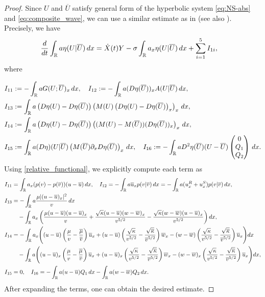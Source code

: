 \documentclass[11pt,reqno]{amsart}
\begin{document}
\begin{proof}
Since $U$ and $\overline{U}$ satisfy general form of the hyperbolic system \eqref{eq:NS-abs} and \eqref{eq:composite_wave}, we can use a similar estimate as in \cite[Lemma 2.3]{KV21} (see also \cite[Lemma 4.2]{HKKL_pre}). Precisely, we have 
\begin{align*}
\frac{d}{dt} \int_\mathbb{R} a \eta (U|\overline{U}) \, dx &=\dot{X}(t)Y-\sigma\int_\mathbb{R} a_x\eta(U|\overline{U}) \, dx+ \sum_{i=1}^5 I_{1i},
\end{align*}
where

\begin{align*}
I_{11}&:=-\int_\mathbb{R} a G(U;\overline{U})_x \, dx,\quad I_{12}:=-\int_\mathbb{R} a (D \eta (\overline{U}))_x A(U| \overline{U}) \, dx,\\
I_{13}&:=\int_\mathbb{R} a \left(D\eta(U)-D\eta(\overline{U}) \right) \left(M(U)\left(D\eta (U)-D\eta(\overline{U}) \right)_x\right)_x\, dx,\\
I_{14}&:=\int_\mathbb{R} a \left( D \eta(U)-D\eta(\overline{U})\right)\left( (M(U) -M(\overline{U}))(D \eta(\overline{U}))_x\right)_x\,dx,\\
I_{15}&:=\int_\mathbb{R}a (D\eta)(U|\overline{U}) \left( M(\overline{U}) \partial_x D \eta(\overline{U}) \right)_x\, dx,\quad I_{16}:=-\int_\mathbb{R} a D^2 \eta(\overline{U})(U-\overline{U}) \begin{pmatrix} 0 \\ Q_1 \\ Q_2 \end{pmatrix} \, dx.
\end{align*} 
Using \eqref{relative_functional}, we explicitly compute each term as
\begin{align*}
I_{11}&=\int_{\mathbb{R}} a_x (p(v)-p(\overline{v}) )(u-\overline{u})\, dx, \quad I_{12}=-\int_{\mathbb{R}} a \overline{u}_x p(v|\overline{v}) \, dx=-\int_{\mathbb{R}}a(u^R_x+u^S_x)p(v|\overline{v})\,dx, \\
I_{13}&=- \int_{\mathbb{R}} a \frac{\mu|(u-\overline{u})_x|^2}{v} \, dx \\
&\quad -\int_{\mathbb{R}} a_x \left(  \frac{\mu (u-\overline{u})(u-\overline{u})_x}{v}+\frac{\sqrt{\kappa}(u-\overline{u})(w-\overline{w})_x}{v^{5/2}}-\frac{\sqrt{\kappa}(w-\overline{w})(u-\overline{u})_x}{v^{5/2}}\right) dx,\\
I_{14}&=-\int_{\mathbb{R}} a_x\Bigg( (u-\overline{u})\left(\frac{\mu}{v}-\frac{\overline{\mu}}{\overline{v}} \right)\overline{u}_x+ (u-\overline{u})\left( \frac{\sqrt{\kappa}}{v^{5/2}}-\frac{\sqrt{\overline{\kappa}}}{\overline{v}^{5/2}} \right)\overline{w}_x-(w-\overline{w}) \left( \frac{\sqrt{\kappa}}{v^{5/2}}-\frac{\sqrt{\overline{\kappa}}}{\overline{v}^{5/2}} \right)\overline{u}_x \Bigg) dx \\
&\quad  -\int_{\mathbb{R}} a \Bigg( (u-\overline{u})_x\left(\frac{\mu}{v}-\frac{\overline{\mu}}{\overline{v}} \right)\overline{u}_x+ (u-\overline{u})_x\left( \frac{\sqrt{\kappa}}{v^{5/2}}-\frac{\sqrt{\overline{\kappa}}}{\overline{v}^{5/2}} \right)\overline{w}_x-(w-\overline{w})_x \left( \frac{\sqrt{\kappa}}{v^{5/2}}-\frac{\sqrt{\overline{\kappa}}}{\overline{v}^{5/2}} \right)\overline{u}_x \Bigg) dx,\\
I_{15}&=0, \quad
I_{16}=-\int_\mathbb{R} a (u-\overline{u}) Q_1 \, dx -\int_{\mathbb{R}} a (w-\overline{w}) Q_2 \, dx.
\end{align*}
After expanding the terms, one can obtain the desired estimate.
\end{proof}
\end{document}
